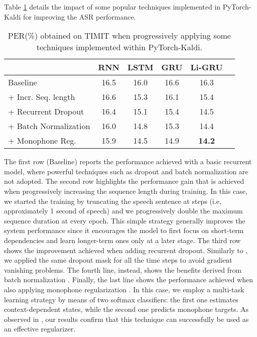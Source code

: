 \documentclass{article}
\begin{document}
Table \ref{tab:res2} details the impact of some popular techniques implemented in PyTorch-Kaldi for improving the ASR performance.
\begin{table}[t!]
\caption{PER(\%) obtained on TIMIT when progressively applying some techniques implemented within PyTorch-Kaldi.}
\centering

\begin{tabular}{l|ccccc}  
& RNN & LSTM & GRU & Li-GRU  \\ \hline
Baseline & 16.5  &  16.0 & 16.6 & 16.3 \\ 
+ Incr. Seq. length & 16.6  &  15.3 & 16.1 & 15.4 \\ 
+ Recurrent Dropout & 16.4  &  	15.1 & 15.4 & 14.5 \\ 
+ Batch Normalization & 16.0  &  14.8 & 15.3 & 14.4 \\ 
+ Monophone Reg. & 15.9  &  14.5 & 14.9 & \textbf{14.2 }\\ 
\bottomrule
\end{tabular}
\label{tab:res2}
\end{table}
The first row (Baseline) reports the performance achieved with a basic recurrent model, where powerful techniques such as dropout and batch normalization are not adopted. The second row highlights the performance gain that is achieved when progressively increasing the sequence length during training. In this case, we started the training by truncating the speech sentence at  steps (i.e, approximately 1 second of speech) and we progressively double the maximum sequence duration at every epoch. This simple strategy generally improves the system performance since it encourages the model to first focus on short-term dependencies and learn longer-term ones only at a later stage. The third row shows the improvement achieved when adding recurrent dropout. Similarly to \cite{drop_asru,ravanelli_is17}, we applied the same dropout mask for all the time steps to avoid gradient vanishing problems. The fourth line, instead, shows the benefits derived from batch normalization \cite{batchnorm}. Finally, the last line shows the performance achieved when also applying monophone regularization \cite{mono_reg}. In this case, we employ a multi-task learning strategy by means of two softmax classifiers: the first one estimates context-dependent states, while the second one predicts monophone targets. As observed in \cite{mono_reg}, our results confirm that this technique can successfully be used as an effective regularizer.
\end{document}
